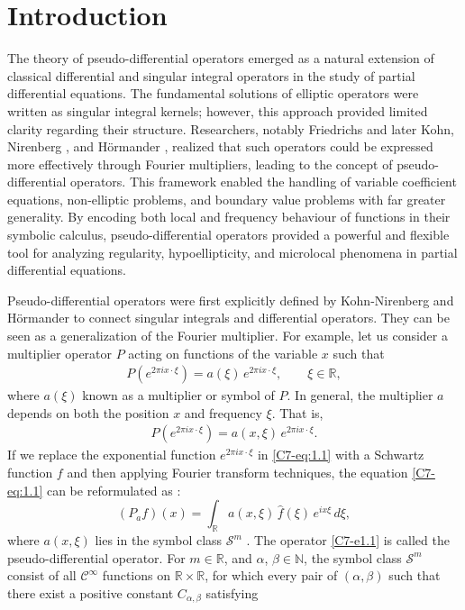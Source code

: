 \documentclass[12pt,a4paper,reqno]{amsproc}
\theoremstyle{definition}
\theoremstyle{remark}
\numberwithin{equation}{section}
\begin{document}
\section{Introduction} 
The theory of pseudo-differential operators emerged as a natural extension of classical differential and singular integral operators in the study of partial differential equations. The fundamental solutions of elliptic operators were written as singular integral kernels; however, this approach provided limited clarity regarding their structure. Researchers, notably Friedrichs and later Kohn, Nirenberg \cite{Kohn}, and H\"ormander \cite{Hormander}, realized that such operators could be expressed more effectively through Fourier multipliers, leading to the concept of pseudo-differential operators. This framework enabled the handling of variable coefficient equations, non-elliptic problems, and boundary value problems with far greater generality. By encoding both local and frequency behaviour of functions in their symbolic calculus, pseudo-differential operators provided a powerful and flexible tool for analyzing regularity, hypoellipticity, and microlocal phenomena in partial differential equations. 
\par Pseudo-differential operators were first explicitly defined by Kohn-Nirenberg \cite{Kohn} and H\"ormander \cite{Hormander} to connect singular integrals and differential operators. They can be seen as a generalization of the Fourier multiplier. For example, let us consider a multiplier operator $P$  acting on functions of the variable $x$ such that
\begin{eqnarray*}
P(e^{2\pi ix\cdot\xi}) = a(\xi)\, e^{2\pi ix\cdot\xi}, \qquad \xi \in \mathbb{R},
\end{eqnarray*}
where $a(\xi)$ known as a multiplier or symbol of $P$.  In general, the multiplier $a$ depends on both the position $x$ and frequency $\xi$.  That is,  
\begin{eqnarray}\label{C7-eq:1.1}
 P(e^{2\pi ix\cdot\xi}) = a(x,\xi)\, e^{2\pi ix\cdot\xi}.  
\end{eqnarray}
 If we replace the exponential function 
$e^{2\pi ix\cdot\xi}$ in \eqref{C7-eq:1.1}
 with a Schwartz function 
$f$ and then applying Fourier transform techniques, the equation \eqref{C7-eq:1.1} can be reformulated as \cite{Wong}:
\begin{equation} \label{C7-e1.1}
    (P_af)(x) = \int_{\mathbb{R}} a(x,\xi)\,\hat{f}(\xi)\,e^{ix
    \xi}\,d\xi,
\end{equation}
 where 
$a(x,\xi)$ lies in the symbol class $\mathcal{S}^m$ \cite{Wong}. The operator \eqref{C7-e1.1} is called the pseudo-differential operator. For $m\in \mathbb{R}$, and $\alpha$, $\beta \in \mathbb{N}$, the symbol class $\mathcal{S}^m$ consist of all $\mathcal{C}^\infty$ functions on $\mathbb{R}\times\mathbb{R}$, for which every pair of $(\alpha,\beta)$ such that there exist a positive constant $C_{\alpha,\beta}$ satisfying
\end{document}
